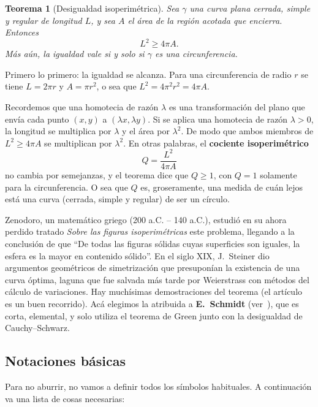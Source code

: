 \documentclass[12pt,a4paper]{article}
\theoremstyle{profesional}
\newtheorem{teorema}{Teorema}[subsection]
\theoremstyle{definicion-style}
\begin{document}
\begin{teorema}[Desigualdad isoperimétrica]\label{teo:iso}
    Sea \( \gamma \) una curva plana cerrada, simple y regular de longitud \( L \), y sea \( A \) el área de la región acotada que encierra.
    Entonces
    \[
        L^2 \geq 4\pi A.
    \]
    Más aún, la igualdad vale si y solo si \( \gamma \) es una circunferencia.
\end{teorema}

Primero lo primero: la igualdad se alcanza. Para una circunferencia de radio \( r \) se tiene \( L = 2\pi r \) y \( A = \pi r^2 \), o sea que \( L^2 = 4\pi^2 r^2 = 4\pi A \).

Recordemos que una homotecia de razón \( \lambda \) es una transformación del plano que envía cada punto \( (x, y) \) a \( (\lambda x, \lambda y) \). Si se aplica una homotecia de razón \( \lambda > 0 \), la longitud se multiplica por \( \lambda \)
y el área por \( \lambda^2 \). De modo que ambos miembros de \( L^2 \geq 4\pi A \) se multiplican por \( \lambda^2 \). En otras palabras, el \textbf{cociente isoperimétrico}
\[
    Q = \frac{L^2}{4\pi A}
\]
no cambia por semejanzas, y el teorema dice que \( Q \geq 1 \), con \( Q = 1 \) solamente para la circunferencia. O sea que \( Q \) es, groseramente, una medida de cuán lejos está una curva (cerrada, simple y regular) de ser un círculo.

Zenodoro, un matemático griego (200 a.C. -- 140 a.C.), estudió en su ahora perdido tratado \emph{Sobre las figuras isoperimétricas} este problema, llegando a la conclusión de que ``De todas las figuras sólidas cuyas superficies son iguales, la esfera es la mayor en contenido sólido''. En el siglo XIX, J.~Steiner dio argumentos geométricos de simetrización que
presuponían la existencia de una curva óptima, laguna que fue salvada más tarde por Weierstrass con métodos del cálculo de variaciones.
Hay muchísimas demostraciones del teorema (el artículo~\cite{osserman} es un buen recorrido). Acá elegimos la atribuida a \textbf{E.~Schmidt} (ver~\cite{docarmo}), que es corta, elemental, y solo utiliza el teorema de Green junto con la desigualdad de Cauchy--Schwarz.

\subsection{Notaciones básicas}

Para no aburrir, no vamos a definir todos los símbolos habituales. A continuación va una lista de cosas necesarias:
\end{document}
